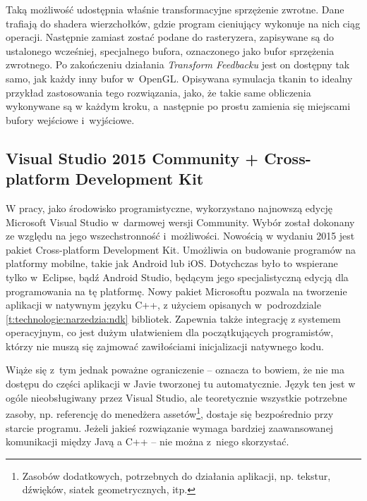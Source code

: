 			Taką możliwość udostępnia właśnie transformacyjne sprzężenie zwrotne. Dane trafiają do shadera wierzchołków, gdzie program cieniujący wykonuje na nich ciąg operacji. Następnie zamiast zostać podane do rasteryzera, zapisywane są do ustalonego wcześniej, specjalnego bufora, oznaczonego jako bufor sprzężenia zwrotnego. Po zakończeniu działania \emph{Transform Feedbacku} jest on dostępny tak samo, jak każdy inny bufor w~OpenGL. Opisywana symulacja tkanin to idealny przykład zastosowania tego rozwiązania, jako, że takie same obliczenia wykonywane są w każdym kroku, a~następnie po prostu zamienia się miejscami bufory wejściowe i~wyjściowe. 
		
		
		\subsection{Visual Studio 2015 Community + Cross-platform Development Kit}
		\label{t:technologie:narzedzia:vs}
		
		
		W pracy, jako środowisko programistyczne, wykorzystano najnowszą edycję Microsoft Visual Studio w~darmowej wersji Community. Wybór został dokonany ze względu na jego wszechstronność i~możliwości. Nowością w wydaniu 2015 jest pakiet Cross-platform Development Kit. Umożliwia on budowanie programów na platformy mobilne, takie jak Android lub iOS. Dotychczas było to wspierane tylko w~Eclipse, bądź Android Studio, będącym jego specjalistyczną edycją dla programowania na tę platformę. Nowy pakiet Microsoftu pozwala na tworzenie aplikacji w natywnym języku C++, z użyciem opisanych w~podrozdziale \ref{t:technologie:narzedzia:ndk} bibliotek. Zapewnia także integrację z systemem operacyjnym, co jest dużym ułatwieniem dla początkujących programistów, którzy nie muszą się zajmować zawiłościami inicjalizacji natywnego kodu. 
		
		Wiąże się z~tym jednak poważne ograniczenie -- oznacza to bowiem, że nie ma dostępu do części aplikacji w Javie tworzonej tu automatycznie. Język ten jest w ogóle nieobsługiwany przez Visual Studio, ale teoretycznie wszystkie potrzebne zasoby, np. referencję do menedżera assetów\footnote{Zasobów dodatkowych, potrzebnych do działania aplikacji, np. tekstur, dźwięków, siatek geometrycznych, itp.}, dostaje się bezpośrednio przy starcie programu. Jeżeli jakieś rozwiązanie wymaga bardziej zaawansowanej komunikacji między Javą a C++ -- nie można z~niego skorzystać.
		
